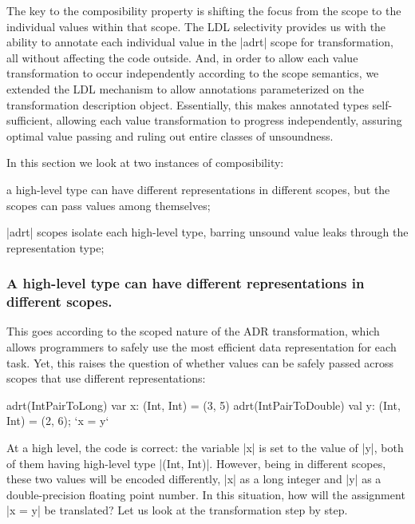 The key to the composibility property is shifting the focus from the scope to the individual values within that scope. The LDL selectivity provides us with the ability to annotate each individual value in the |adrt| scope for transformation, all without affecting the code outside. And, in order to allow each value transformation to occur independently according to the scope semantics, we extended the LDL mechanism to allow annotations parameterized on the transformation description object. Essentially, this makes annotated types self-sufficient, allowing each value transformation to progress independently, assuring optimal value passing and ruling out entire classes of unsoundness.

In this section we look at two instances of composibility:

\begin{compactitem}
  \item a high-level type can have different representations in different scopes, but the scopes can pass values among themselves;
  \item |adrt| scopes isolate each high-level type, barring unsound value leaks through the representation type;
\end{compactitem}

\subsubsection{A high-level type can have different representations in different scopes.} This goes according to the scoped nature of the ADR transformation, which allows programmers to safely use the most efficient data representation for each task. Yet, this raises the question of whether values can be safely passed across scopes that use different representations:

\begin{lstlisting-nobreak}
adrt(IntPairToLong)   { var x: (Int, Int) = (3, 5) }
adrt(IntPairToDouble) { val y: (Int, Int) = (2, 6); `x = y` }
\end{lstlisting-nobreak}

At a high level, the code is correct: the variable |x| is set to the value of |y|, both of them having high-level type |(Int, Int)|. However, being in different scopes, these two values will be encoded differently, |x| as a long integer and |y| as a double-precision floating point number. In this situation, how will the assignment |x = y| be translated? Let us look at the transformation step by step.

